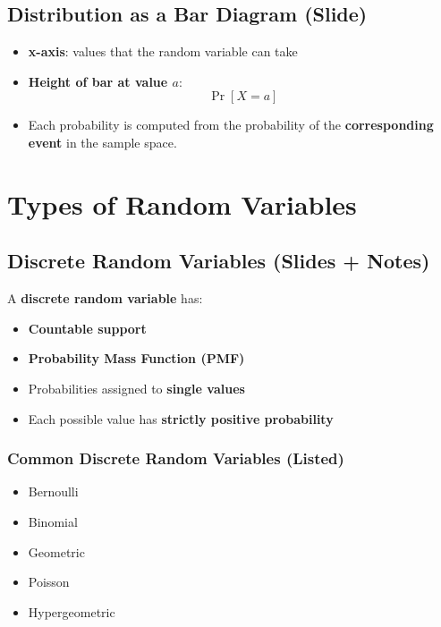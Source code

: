 \documentclass[11pt]{article}
\begin{document}
\subsection*{Distribution as a Bar Diagram (Slide)}

\begin{itemize}
    \item \textbf{x-axis}: values that the random variable can take
    \item \textbf{Height of bar at value \( a \)}:
    \[
    \Pr[X = a]
    \]
    \item Each probability is computed from the probability of the \textbf{corresponding event} in the sample space.
\end{itemize}

\vspace{1em}

\section{Types of Random Variables}

\subsection{Discrete Random Variables (Slides + Notes)}

A \textbf{discrete random variable} has:
\begin{itemize}
    \item \textbf{Countable support}
    \item \textbf{Probability Mass Function (PMF)}
    \item Probabilities assigned to \textbf{single values}
    \item Each possible value has \textbf{strictly positive probability}
\end{itemize}

\subsubsection*{Common Discrete Random Variables (Listed)}

\begin{itemize}
    \item Bernoulli
    \item Binomial
    \item Geometric
    \item Poisson
    \item Hypergeometric
\end{itemize}
\end{document}
